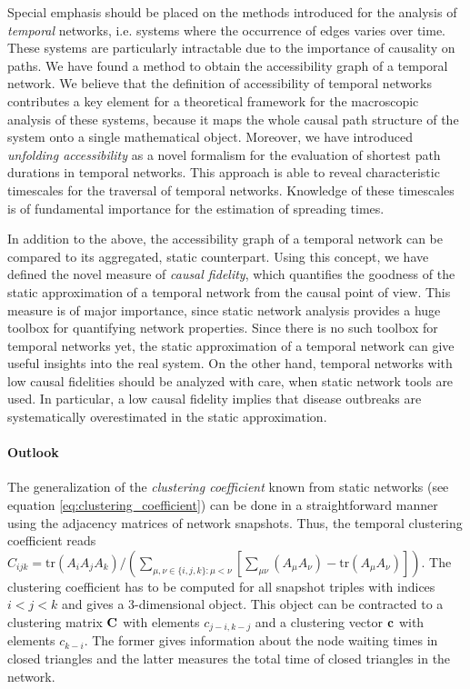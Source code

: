 Special emphasis should be placed on the methods introduced for the analysis of \emph{temporal} networks, i.e. systems where the occurrence of edges varies over time.
These systems are particularly intractable due to the importance of causality on paths.
We have found a method to obtain the accessibility graph of a temporal network.
We believe that the definition of accessibility of temporal networks contributes a key element for a theoretical framework for the macroscopic analysis of these systems, because it maps the whole causal path structure of the system onto a single mathematical object.
Moreover, we have introduced \emph{unfolding accessibility} as a novel formalism for the evaluation of shortest path durations in temporal networks.
This approach is able to reveal characteristic timescales for the traversal of temporal networks.
Knowledge of these timescales is of fundamental importance for the estimation of spreading times.

In addition to the above, the accessibility graph of a temporal network can be compared to its aggregated, static counterpart.
Using this concept, we have defined the novel measure of \emph{causal fidelity}, which quantifies the goodness of the static approximation of a temporal network from the causal point of view.
This measure is of major importance, since static network analysis provides a huge toolbox for quantifying network properties. 
Since there is no such toolbox for temporal networks yet, the static approximation of a temporal network can give useful insights into the real system.
On the other hand, temporal networks with low causal fidelities should be analyzed with care, when static network tools are used.
In particular, a low causal fidelity implies that disease outbreaks are systematically overestimated in the static approximation.


\paragraph{Outlook\color{Cayenne}{.}}
The generalization of the \emph{clustering coefficient} known from static networks (see equation \eqref{eq:clustering_coefficient}) can be done in a straightforward manner using the adjacency matrices of network snapshots.
Thus, the temporal clustering coefficient reads $C_{ijk}=\text{tr} (A_{i}A_{j}A_{k})/( \sum_{\mu,\nu\in\{i,j,k\}:\mu<\nu}\left[\sum _{\mu \nu }\left(A_{\mu}A_{\nu}\right)-\text{tr}\left(A_{\mu}A_{\nu}\right)\right])$.
The clustering coefficient has to be computed for all snapshot triples with indices $i<j<k$ and gives a 3-dimensional object.
This object can be contracted to a clustering matrix $\mathbf{C}$ with elements $c_{j-i,k-j}$ and a clustering vector $\mathbf{c}$ with elements $c_{k-i}$.
The former gives information about the node waiting times in closed triangles and the latter measures the total time of closed triangles in the network.

